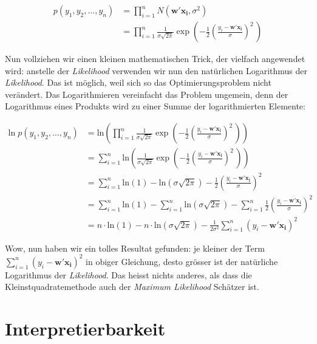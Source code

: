 \documentclass[
]{book}
\begin{document}
\begin{align}
p(y_1,y_2,\dots,y_n) &= \prod_{i=1}^n N\left(\mathbf{w}' \mathbf{x_i}, \sigma^2\right) \\
&= \prod_{i=1}^n \frac{1}{\sigma\sqrt{2\pi}} \exp\left( -\frac{1}{2}\left(\frac{y_i - \mathbf{w}' \mathbf{x_i}}{\sigma}\right)^{\!2}\,\right)
\end{align}

Nun vollziehen wir einen kleinen mathematischen Trick, der vielfach angewendet wird: anstelle der \emph{Likelihood} verwenden wir nun den natürlichen Logarithmus der \emph{Likelihood}. Das ist möglich, weil sich so das Optimierungsproblem nicht verändert. Das Logarithmieren vereinfacht das Problem ungemein, denn der Logarithmus eines Produkts wird zu einer Summe der logarithmierten Elemente:

\begin{align}
\text{ln}\; p(y_1,y_2,\dots,y_n) &= \text{ln}\left(\prod_{i=1}^n \frac{1}{\sigma\sqrt{2\pi}} \exp\left( -\frac{1}{2}\left(\frac{y_i - \mathbf{w}' \mathbf{x_i}}{\sigma}\right)^{\!2}\,\right)\right) \\
&= \sum_{i=1}^n \text{ln}\left(\frac{1}{\sigma\sqrt{2\pi}} \exp\left( -\frac{1}{2}\left(\frac{y_i - \mathbf{w}' \mathbf{x_i}}{\sigma}\right)^{\!2}\,\right) \right) \\
&= \sum_{i=1}^n \text{ln}\left(1\right) - \text{ln}\left(\sigma\sqrt{2\pi}\right) - \frac{1}{2}\left(\frac{y_i - \mathbf{w}' \mathbf{x_i}}{\sigma}\right)^{\!2} \\
&= \sum_{i=1}^n \text{ln}\left(1\right) - \sum_{i=1}^n \text{ln}\left(\sigma\sqrt{2\pi}\right) - \sum_{i=1}^n \frac{1}{2}\left(\frac{y_i - \mathbf{w}' \mathbf{x_i}}{\sigma}\right)^{\!2} \\
&= n \cdot \text{ln}\left(1\right) - n \cdot \text{ln}\left(\sigma\sqrt{2\pi}\right) - \frac{1}{2\sigma^2} \sum_{i=1}^n \left(y_i - \mathbf{w}' \mathbf{x_i}\right)^{\!2}
\end{align}

Wow, nun haben wir ein tolles Resultat gefunden: je kleiner der Term \(\sum_{i=1}^n \left(y_i - \mathbf{w}' \mathbf{x_i}\right)^{\!2}\) in obiger Gleichung, desto grösser ist der natürliche Logarithmus der \emph{Likelihood}. Das heisst nichts anderes, als dass die Kleinstquadratemethode auch der \emph{Maximum Likelihood} Schätzer ist.

\hypertarget{interpretierbarkeit}{%
\section{Interpretierbarkeit}\label{interpretierbarkeit}}
\end{document}
